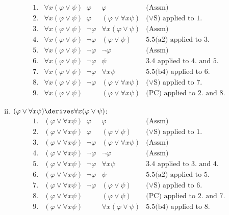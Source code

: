 \begin{enumerate}[1.]
\begin{enumerate}[(i)]
\[
\begin{array}{llll}
1. & \forall x (\varphi \lor \psi) \;\; \varphi & \varphi & \mbox{(Assm)} \\
2. & \forall x (\varphi \lor \psi) \;\; \varphi & (\varphi \lor \forall x \psi) & \mbox{($\lor$S) applied to 1.} \\
3. & \forall x (\varphi \lor \psi) \;\; \neg \varphi & \forall x (\varphi \lor \psi) & \mbox{(Assm)} \\
4. & \forall x (\varphi \lor \psi) \;\; \neg \varphi & (\varphi \lor \psi) & \mbox{5.5(a2) applied to 3.} \\
5. & \forall x (\varphi \lor \psi) \;\; \neg \varphi & \neg \varphi & \mbox{(Assm)} \\
6. & \forall x (\varphi \lor \psi) \;\; \neg \varphi & \psi & \mbox{3.4 applied to 4. and 5.} \\
7. & \forall x (\varphi \lor \psi) \;\; \neg \varphi & \forall x \psi & \mbox{5.5(b4) applied to 6.} \\
8. & \forall x (\varphi \lor \psi) \;\; \neg \varphi & (\varphi \lor \forall x \psi) & \mbox{($\lor$S) applied to 7.} \\
9. & \forall x (\varphi \lor \psi) & (\varphi \lor \forall x \psi) & \mbox{(PC) applied to 2. and 8.}
\end{array}
\]
\item $(\varphi \lor \forall x \psi) \derives \forall x (\varphi \lor \psi)$:
\[
\begin{array}{llll}
1. & (\varphi \lor \forall x \psi) \;\; \varphi & \varphi & \mbox{(Assm)} \\
2. & (\varphi \lor \forall x \psi) \;\; \varphi & (\varphi \lor \psi) & \mbox{($\lor$S) applied to 1.} \\
3. & (\varphi \lor \forall x \psi) \;\; \neg \varphi & (\varphi \lor \forall x \psi) & \mbox{(Assm)} \\
4. & (\varphi \lor \forall x \psi) \;\; \neg \varphi & \neg \varphi & \mbox{(Assm)} \\
5. & (\varphi \lor \forall x \psi) \;\; \neg \varphi & \forall x \psi & \mbox{3.4 applied to 3. and 4.} \\
6. & (\varphi \lor \forall x \psi) \;\; \neg \varphi & \psi & \mbox{5.5(a2) applied to 5.} \\
7. & (\varphi \lor \forall x \psi) \;\; \neg \varphi & (\varphi \lor \psi) & \mbox{($\lor$S) applied to 6.} \\
8. & (\varphi \lor \forall x \psi) & (\varphi \lor \psi) & \mbox{(PC) applied to 2. and 7.} \\
9. & (\varphi \lor \forall x \psi) & \forall x (\varphi \lor \psi) & \mbox{5.5(b4) applied to 8.}
\end{array}
\]
\end{enumerate}
\end{enumerate}
